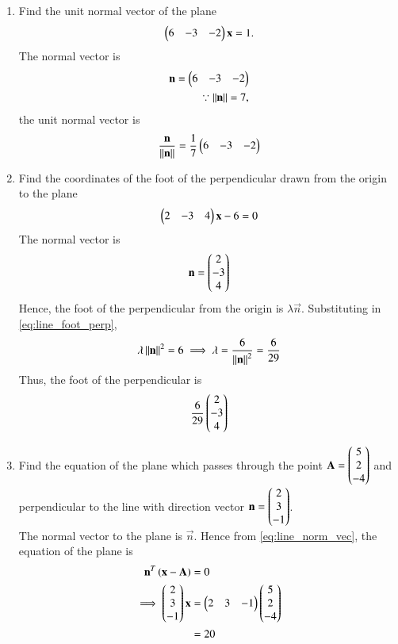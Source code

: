 \begin{enumerate}[label=\arabic*.,ref=\thesubsection.\theenumi]
\item Find the unit normal vector of the plane 
\begin{align}
\begin{pmatrix}6 & -3 & -2\end{pmatrix}\mathbf{x}  = 1.
\end{align}
%
\solution The normal vector is 
%
\begin{align}
\mathbf{n} = \begin{pmatrix}6 & -3 & -2\end{pmatrix}
\\
\because \left\lVert\mathbf{n}\right\rVert = 7,
\end{align}
%
the unit normal vector is 
%
\begin{align}
\frac{\mathbf{n}}{\left\lVert\mathbf{n}\right\rVert} = \frac{1}{7}\begin{pmatrix}6 & -3 & -2\end{pmatrix}
\end{align}
%
\item Find the coordinates of the foot of the perpendicular drawn from the origin to the plane 
\begin{align}
\label{eq:line_foot_perp}
\begin{pmatrix}2 & -3 & 4\end{pmatrix}\mathbf{x}-6  = 0
\end{align}
%
\solution The normal vector is 
%
\begin{align}
\mathbf{n}=\begin{pmatrix}2 \\ -3 \\ 4\end{pmatrix}
\end{align}
%
Hence, the foot of the perpendicular from the origin is $\lambda \vec{n}$.  Substituting in \eqref{eq:line_foot_perp},
\begin{align}
\lambda \left\lVert\mathbf{n}\right\rVert^2 = 6  \implies \lambda = \frac{6}{\left\lVert\mathbf{n}\right\rVert^2} = \frac{6}{29}
\end{align}
%
Thus, the foot of the perpendicular is
%
\begin{align}
\frac{6}{29}\begin{pmatrix}2 \\ -3 \\ 4\end{pmatrix}
\end{align}
%
\item Find the equation of the plane which passes through the point $\mathbf{A}=\begin{pmatrix}5\\2\\-4\end{pmatrix}$ and perpendicular to the line with direction vector $\mathbf{n}=\begin{pmatrix}2\\3\\-1\end{pmatrix}$.
%
\\
\solution  The normal vector to the plane is $\vec{n}$. Hence from \eqref{eq:line_norm_vec}, the equation of the plane is 
%
\begin{align}
\mathbf{n}^T\left(\mathbf{x}-\mathbf{A}\right) &= 0
\\
\implies \begin{pmatrix}2\\3\\-1\end{pmatrix}\mathbf{x} &=\begin{pmatrix}2&3&-1\end{pmatrix}\begin{pmatrix}5\\2\\-4\end{pmatrix}
\\
&=20
\end{align}
%
%


\end{enumerate}
